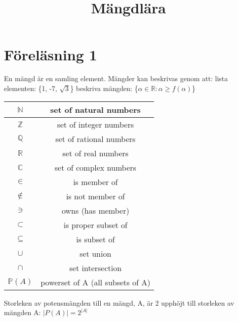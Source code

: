 \documentclass{article}
\title{Mängdlära}
\begin{document}
\maketitle

\section{Föreläsning 1}
En mängd är en samling element. Mängder kan beskrivas genom att:
\newline* lista elementen: \{1, -7, $\sqrt{3}$\}
\newline* beskriva mängden: \{$\alpha \in \mathbb{R}: \alpha \geq f(\alpha)$\}
\newline\newline
\begin{tabular}{|c|c|}
\hline
    $\mathbb{N}$ & set of natural numbers \\\hline
    $\mathbb{Z}$ & set of integer numbers \\\hline
    $\mathbb{Q}$ & set of rational numbers \\\hline
    $\mathbb{R}$ & set of real numbers \\\hline
    $\mathbb{C}$ & set of complex numbers \\\hline
    $\in$ & is member of \\\hline
    $\notin$ & is not member of \\\hline
    $\ni$ & owns (has member) \\\hline
    $\subset$ & is proper subset of \\\hline
    $\subseteq$ & is subset of \\\hline
    $\cup$ & set union \\\hline
    $\cap$ & set intersection \\\hline
    $\mathbb{P}(A)$ & powerset of A (all subsets of A) \\\hline
\end{tabular}
\newline\newline
Storleken av potensmängden till en mängd, A, är 2 upphöjt till storleken av mängden A: $|P(A)| = 2^{|A|}$
\end{document}
